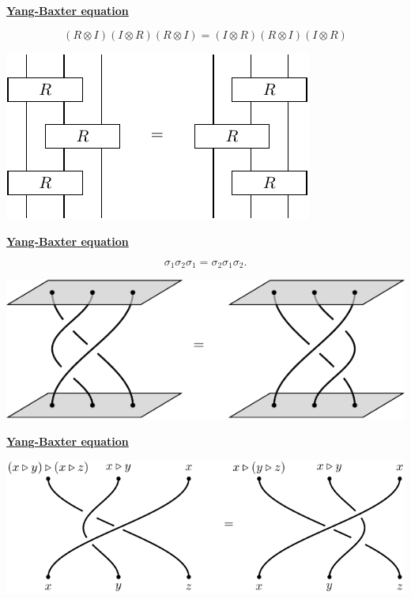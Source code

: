 \documentclass[11pt]{article}
\def\heading #1{\centerline{\underline{\bf\LARGE #1}}}
\def\vsp {\vskip 0.5cm}
\def\tensor{\otimes}
\begin{document}
\heading{Yang-Baxter equation}
\vsp

$$(R\tensor I) (I\tensor R) (R\tensor I) = (I\tensor R) (R\tensor I) (I\tensor R)$$
\vsp
\centerline{\includegraphics[]{pic-yb.pdf}}


\newpage %

\heading{Yang-Baxter equation}
\vsp
$$\sigma_1 \sigma_2 \sigma_1 = \sigma_2 \sigma_1 \sigma_2.$$
\vsp
\centerline{\includegraphics[]{pic-braid.pdf}}


\newpage %

\heading{Yang-Baxter equation}
\vsp
\centerline{\includegraphics[]{pic-braid-shelf.pdf}}
\end{document}
